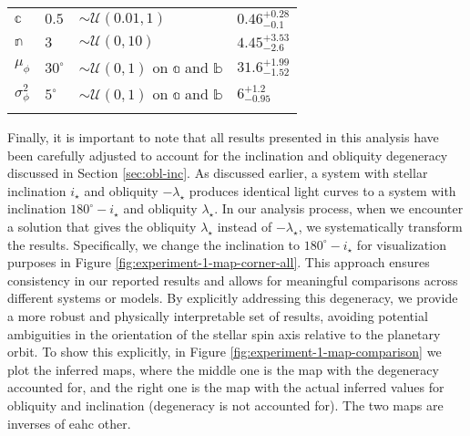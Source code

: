 \documentclass[twocolumn]{aastex631}
\begin{document}
\begin{table}[]
\begin{tabular}{llll}
    $\mathbb{c}$                              & $0.5$                 & $\sim\mathcal{U}(0.01, 1)$           & $0.46^{+0.28}_{-0.1}$                               \\
    $\mathbb{n}$                              & $3$                   & $\sim\mathcal{U}(0, 10)$             & $4.45^{+3.53}_{-2.6}$                               \\
    $\mu_\phi$                                & $30^\circ$            & $\sim\mathcal{U}(0, 1)$ on $\mathbb{a}$ and $\mathbb{b}$ & $31.6^{+1.99}_{-1.52}$                               \\
    $\sigma^2_\phi$                           & $5^\circ$             & $\sim\mathcal{U}(0, 1)$ on $\mathbb{a}$ and $\mathbb{b}$ & $6^{+1.2}_{-0.95}$                      \\ \hline
    \label{tab:LongPriors}
    \end{tabular}
\end{table}
%

Finally, it is important to note that all results presented in this analysis have been carefully adjusted to account for the inclination and obliquity 
degeneracy discussed in Section \ref{sec:obl-inc}. As discussed earlier, a system with stellar inclination $i_\star$ and obliquity $-\lambda_\star$ 
produces identical light curves to a system with inclination $180^\circ-i_\star$ and obliquity $\lambda_\star$. In our analysis process, 
when we encounter a solution that gives the obliquity $\lambda_\star$ instead of $-\lambda_\star$, we systematically transform the results. 
Specifically, we change the inclination to $180^\circ-i_\star$ for visualization purposes in Figure \ref{fig:experiment-1-map-corner-all}. 
This approach ensures consistency in our reported results and allows for meaningful comparisons across different systems or models. 
By explicitly addressing this degeneracy, we provide a more robust and physically interpretable set of results, avoiding potential ambiguities in the 
orientation of the stellar spin axis relative to the planetary orbit. To show this explicitly, in Figure \ref{fig:experiment-1-map-comparison}
we plot the inferred maps, where the middle one is the map with the degeneracy accounted for, and the right one is the map with the actual inferred values 
for obliquity and inclination (degeneracy is not accounted for). The two maps are inverses of eahc other.
\end{document}
